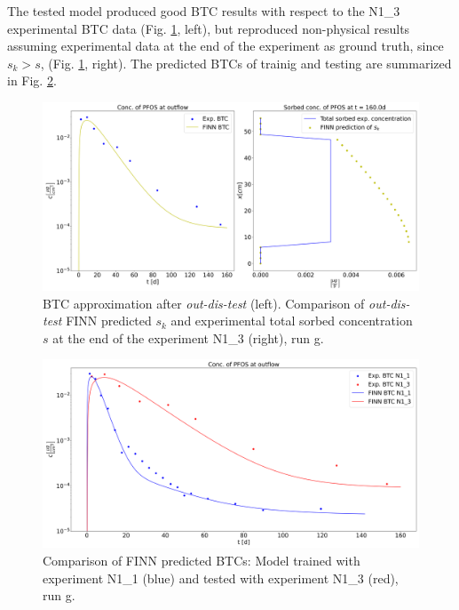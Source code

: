 The tested model produced good BTC results with respect to the N1\_3 experimental BTC data (Fig. \ref{fig:res_btc_exp_FGR_test}, left), but reproduced non-physical results assuming experimental data at the end of the experiment as ground truth, since $s_k > s$, (Fig. \ref{fig:res_btc_exp_FGR_test}, right).
The predicted BTCs of trainig and testing are summarized in Fig. \ref{fig:res_btc_exp_FGR_comp}.
\begin{figure}[h]
	\centering
	\includegraphics[width=\textwidth]{images/res_btc_exp_FGR_test.png}
\caption[FINN predicted BTC after testing, run g]{BTC approximation after \textit{out-dis-test} (left). Comparison of \textit{out-dis-test} FINN predicted $s_k$ and experimental total sorbed concentration $s$ at the end of the experiment N1\_3 (right), run g.}
\label{fig:res_btc_exp_FGR_test}
\end{figure}
\begin{figure}[h]
	\centering
	\includegraphics[width=\textwidth]{images/res_btc_exp_FGR_comp.png}
\caption[Comparison of tested and trained BTCs, run g]{Comparison of FINN predicted BTCs: Model trained with experiment N1\_1 (blue) and tested with experiment N1\_3 (red), run g.}
\label{fig:res_btc_exp_FGR_comp}
\end{figure}
\FloatBarrier
